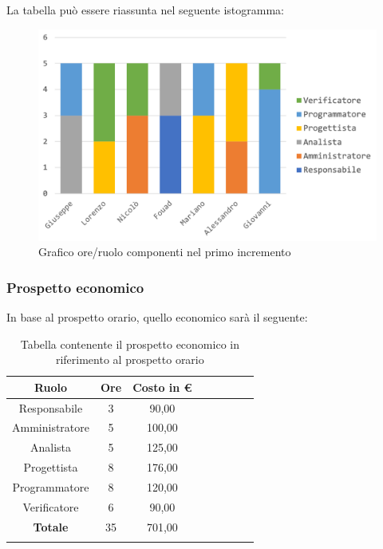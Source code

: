 		La tabella può essere riassunta nel seguente istogramma:
		\begin{figure}[H]
			\centering
			\includegraphics[width=0.8\linewidth]{./images/preventivo/incremento1-1.png}
			\caption{Grafico ore/ruolo componenti nel primo incremento}
			\label{fig:grafico suddivione ruoli incremento I}
		\end{figure}
	
		\subsubsection{Prospetto economico}
		In base al prospetto orario, quello economico sarà il seguente: 
		
		\begin{longtable}{|c|c|c|c|c|c|c|c|}
			\hline
			\rowcolor{lighter-grayer}
			\textbf{Ruolo} & \textbf{Ore} & \textbf{Costo in € } \\
			\hline
			\endfirsthead
			
			\hline
			Responsabile 	    & 3 & 90,00\\
			\hline 
			\hline
			Amministratore	   & 5 & 100,00\\
			\hline
			\hline
			Analista 				& 5 & 125,00\\
			\hline
			\hline
			Progettista 		   & 8 & 176,00\\
			\hline
			\hline
			Programmatore 	  & 8 & 120,00\\
			\hline
			\hline
			Verificatore 		   & 6 & 90,00\\
			\hline
			\textbf{Totale} 	 & 35 & 701,00\\
			\hline
			\caption{Tabella contenente il prospetto economico in riferimento al prospetto orario}
		\end{longtable}
		\pagebreak
		
